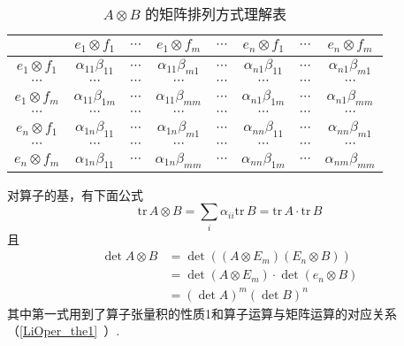 \begin{table}[ht]
\centering
\caption{ $A\otimes B$ 的矩阵排列方式理解表}\label{TPofLO_tab1}
\begin{tabular}{|c|c|c|c|c|c|c|c|}
\hline
 & $e_1\otimes f_1$ & $\cdots$ & $e_1\otimes f_m$ & $\cdots$ & $e_n\otimes f_1$ & $\cdots$ & $e_n\otimes f_m$ \\
\hline
$e_1\otimes f_1$ & $\alpha_{11}\beta_{11}$ & $\cdots$ & $\alpha_{11}\beta_{m1}$ & $\cdots$ & $\alpha_{n1}\beta_{11}$ & $\cdots$ & $\alpha_{n1}\beta_{m1}$ \\
\hline
$\cdots$ & $\cdots$ & $\cdots$ & $\cdots$ & $\cdots$ & $\cdots$ & $\cdots$ & $\cdots$ \\
\hline
$e_1\otimes f_m$ & $\alpha_{11}\beta_{1m}$ & $\cdots$ & $\alpha_{11}\beta_{mm}$ & $\cdots$ & $\alpha_{n1}\beta_{1m}$ & $\cdots$ & $\alpha_{n1}\beta_{mm}$ \\
\hline
$\cdots$ & $\cdots$ & $\cdots$ & $\cdots$ & $\cdots$ & $\cdots$ & $\cdots$ & $\cdots$ \\
\hline
$e_n\otimes f_1$ &  $\alpha_{1n}\beta_{11}$ & $\cdots$ & $\alpha_{1n}\beta_{m1}$ & $\cdots$ & $\alpha_{nn}\beta_{11}$ & $\cdots$ & $\alpha_{nn}\beta_{m1}$ \\
\hline
$\cdots$ & $\cdots$ & $\cdots$ & $\cdots$ & $\cdots$ & $\cdots$ & $\cdots$ & $\cdots$ \\
\hline
$e_n\otimes f_m$ & $\alpha_{1n}\beta_{11}$ & $\cdots$ & $\alpha_{1n}\beta_{mm}$ & $\cdots$ & $\alpha_{nn}\beta_{1m}$ & $\cdots$ & $\alpha_{nm}\beta_{mm}$\\
\hline
\end{tabular}
\end{table}

对算子的基，有下面公式
\begin{equation}
\mathrm{tr}\,A\otimes B=\sum_{i}\alpha_{ii}\mathrm{tr}\,B=\mathrm{tr}\,A\cdot\mathrm{tr}\,B
\end{equation}
且
\begin{equation}
\begin{aligned}
\det A\otimes B&=\det((A\otimes E_m)(E_n\otimes B))\\
&=\det(A\otimes E_m)\cdot\det(e_n\otimes B)\\
&=(\det A)^m(\det B)^n
\end{aligned}
\end{equation}
其中第一式用到了算子张量积的性质1和算子运算与矩阵运算的对应关系（\autoref{LiOper_the1}~）.
